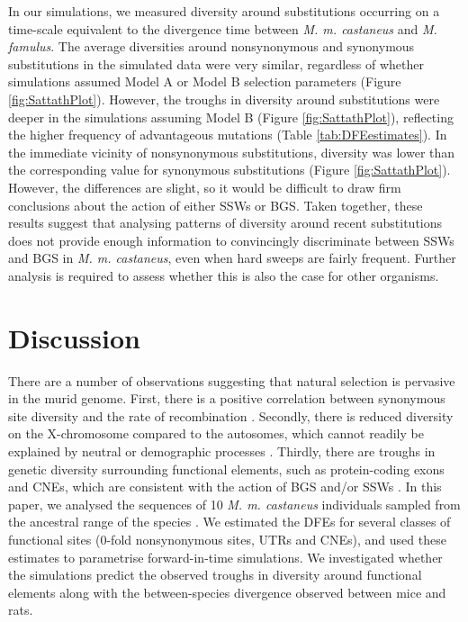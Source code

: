 	In our simulations, we measured diversity around substitutions occurring on a time-scale equivalent to the divergence time between \textit{M. m. castaneus} and \textit{M. famulus}. The average diversities around nonsynonymous and synonymous substitutions in the simulated data were very similar, regardless of whether simulations assumed Model A or Model B selection parameters (Figure \ref{fig:SattathPlot}). However, the troughs in diversity around substitutions were deeper in the simulations assuming Model B (Figure \ref{fig:SattathPlot}), reflecting the higher frequency of advantageous mutations (Table \ref{tab:DFEestimates}). In the immediate vicinity of nonsynonymous substitutions, diversity was lower than the corresponding value for synonymous substitutions (Figure \ref{fig:SattathPlot}). However, the differences are slight, so it would be difficult to draw firm conclusions about the action of either SSWs or BGS. Taken together, these results suggest that analysing patterns of diversity around recent substitutions does not provide enough information to convincingly discriminate between SSWs and BGS in \textit{M. m. castaneus}, even when hard sweeps are fairly frequent. Further analysis is required to assess whether this is also the case for other organisms.

\linespread{1}

\linespread{2}

\section{Discussion}

There are a number of observations suggesting that natural selection is pervasive in the murid genome. First, there is a positive correlation between synonymous site diversity and the rate of recombination \citep{RN340}. Secondly, there is reduced diversity on the X-chromosome compared to the autosomes, which cannot readily be explained by neutral or demographic processes \citep{RN233}. Thirdly, there are troughs in genetic diversity surrounding functional elements, such as protein-coding exons and CNEs, which are consistent with the action of BGS and/or SSWs \citep{RN122}. In this paper, we analysed the sequences of 10 \textit{M. m. castaneus} individuals sampled from the ancestral range of the species \citep{RN122}. We estimated the DFEs for several classes of functional sites (0-fold nonsynonymous sites, UTRs and CNEs), and used these estimates to parametrise forward-in-time simulations. We investigated whether the simulations predict the observed troughs in diversity around functional elements along with the between-species divergence observed between mice and rats.

